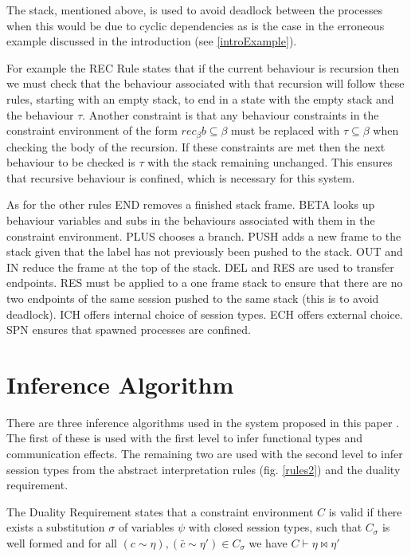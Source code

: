 The stack, mentioned above, is used to avoid deadlock between the processes when this would be due to cyclic dependencies as is the case in the erroneous example discussed in the introduction (see \ref{introExample}).

For example the REC Rule states that if the current behaviour is recursion then we must check that the behaviour associated with that recursion will follow these rules, starting with an empty stack, to end in a state with the empty stack and the behaviour $\tau$. Another constraint is that any behaviour constraints in the constraint environment of the form $rec_{\beta}b \subseteq \beta$ must be replaced with $\tau \subseteq \beta$ when checking the body of the recursion. If these constraints are met then the next behaviour to be checked is $\tau$ with the stack remaining unchanged. This ensures that recursive behaviour is confined, which is necessary for this system. 

As for the other rules END removes a finished stack frame. BETA looks up behaviour variables and subs in the behaviours associated with them in the constraint environment. PLUS chooses a branch. PUSH adds a new frame to the stack given that the label has not previously been pushed to the stack. OUT and IN reduce the frame at the top of the stack. DEL and RES are used to transfer endpoints. RES must be applied to a one frame stack to ensure that there are no two endpoints of the same session pushed to the same stack (this is to avoid deadlock). ICH offers internal choice of session types. ECH offers external choice. SPN ensures that spawned processes are confined. 

\section{Inference Algorithm}

There are three inference algorithms used in the system proposed in this paper \cite{paper1}. The first of these is used with the first level to infer functional types and communication effects. The remaining two are used with the second level to infer session types from the abstract interpretation rules (fig. \ref{rules2}) and the duality requirement. 

The Duality Requirement states that a constraint environment $C$ is valid if there exists a substitution $\sigma$ of variables $\psi$ with closed session types, such that $C_\sigma$ is well formed and for all $(c\sim \eta), (\bar{c} \sim \eta') \in C_\sigma$ we have $C \vdash \eta \bowtie \eta'$

